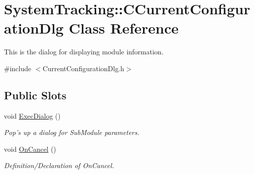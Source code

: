 \hypertarget{classSystemTracking_1_1CCurrentConfigurationDlg}{\section{\-System\-Tracking\-:\-:\-C\-Current\-Configuration\-Dlg \-Class \-Reference}
\label{classSystemTracking_1_1CCurrentConfigurationDlg}
}


\-This is the dialog for displaying module information.  




{\ttfamily \#include $<$\-Current\-Configuration\-Dlg.\-h$>$}

\subsection*{\-Public \-Slots}
\begin{DoxyCompactItemize}
\item 
void \hyperlink{classSystemTracking_1_1CCurrentConfigurationDlg_a7a222f0187854b93972414bbade9bc4c}{\-Exec\-Dialog} ()
\begin{DoxyCompactList}\small\item\em \-Pop's up a dialog for \-Sub\-Module parameters. \end{DoxyCompactList}\item 
void \hyperlink{classSystemTracking_1_1CCurrentConfigurationDlg_ac38487272f67e0a3f3fda84022b84ae2}{\-On\-Cancel} ()
\begin{DoxyCompactList}\small\item\em \-Definition/\-Declaration of \-On\-Cancel. \end{DoxyCompactList}\end{DoxyCompactItemize}
